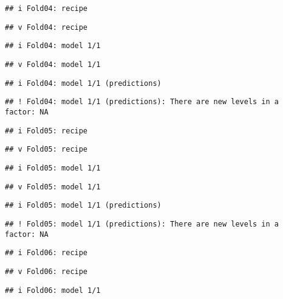 \documentclass[
]{article}
\begin{document}
\begin{verbatim}
## i Fold04: recipe
\end{verbatim}

\begin{verbatim}
## v Fold04: recipe
\end{verbatim}

\begin{verbatim}
## i Fold04: model 1/1
\end{verbatim}

\begin{verbatim}
## v Fold04: model 1/1
\end{verbatim}

\begin{verbatim}
## i Fold04: model 1/1 (predictions)
\end{verbatim}

\begin{verbatim}
## ! Fold04: model 1/1 (predictions): There are new levels in a factor: NA
\end{verbatim}

\begin{verbatim}
## i Fold05: recipe
\end{verbatim}

\begin{verbatim}
## v Fold05: recipe
\end{verbatim}

\begin{verbatim}
## i Fold05: model 1/1
\end{verbatim}

\begin{verbatim}
## v Fold05: model 1/1
\end{verbatim}

\begin{verbatim}
## i Fold05: model 1/1 (predictions)
\end{verbatim}

\begin{verbatim}
## ! Fold05: model 1/1 (predictions): There are new levels in a factor: NA
\end{verbatim}

\begin{verbatim}
## i Fold06: recipe
\end{verbatim}

\begin{verbatim}
## v Fold06: recipe
\end{verbatim}

\begin{verbatim}
## i Fold06: model 1/1
\end{verbatim}
\end{document}

